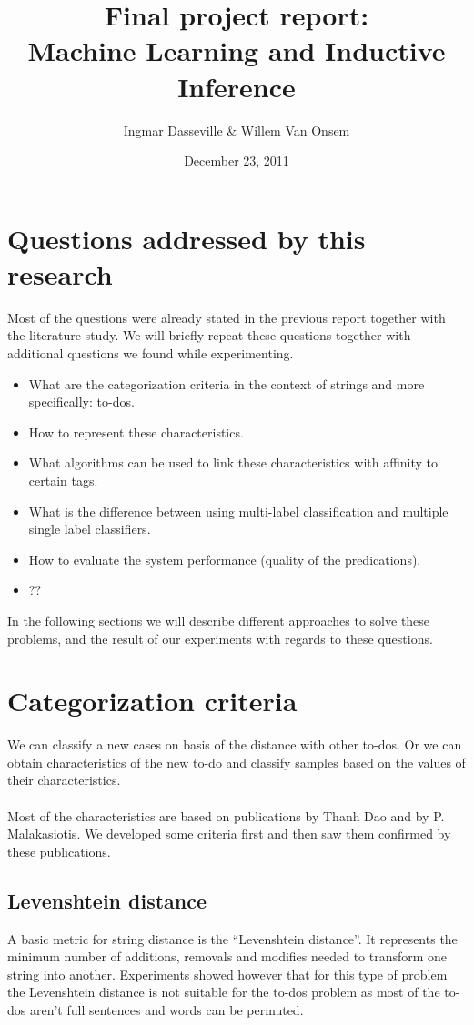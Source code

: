 \documentclass[a4paper,titlepage]{article}
\title{Final project report:\\Machine Learning and Inductive Inference}
\author{Ingmar Dasseville \& Willem Van Onsem}
\date{December 23, 2011}
\begin{document}
\begin{titlepage}
\maketitle
\end{titlepage}
\tableofcontents
\newpage
\section{Questions addressed by this research}
Most of the questions were already stated in the previous report together with the literature study. We will briefly repeat these questions together with additional questions we found while experimenting.
\begin{itemize}
 \item What are the categorization criteria in the context of strings and more specifically: to-dos.
 \item How to represent these characteristics.
 \item What algorithms can be used to link these characteristics with affinity to certain tags.
 \item What is the difference between using multi-label classification and multiple single label classifiers.
 \item How to evaluate the system performance (quality of the predications).
 \item ??
\end{itemize}
In the following sections we will describe different approaches to solve these problems, and the result of our experiments with regards to these questions.
\section{Categorization criteria}
We can classify a new cases on basis of the distance with other to-dos. Or we can obtain characteristics of the new to-do and classify samples based on the values of their characteristics.
\paragraph{}
Most of the characteristics are based on publications \cite{codeproject2,codeproject1} by Thanh Dao and \cite{Malakasiotis:2007:LTE:1654536.1654547} by P. Malakasiotis. We developed some criteria first and then saw them confirmed by these publications.
\subsection{Levenshtein distance}
A basic metric for string distance is the ``Levenshtein distance''. It represents the minimum number of additions, removals and modifies needed to transform one string into another. Experiments showed however that for this type of problem the Levenshtein distance is not suitable for the to-dos problem as most of the to-dos aren't full sentences and words can be permuted.
\end{document}
